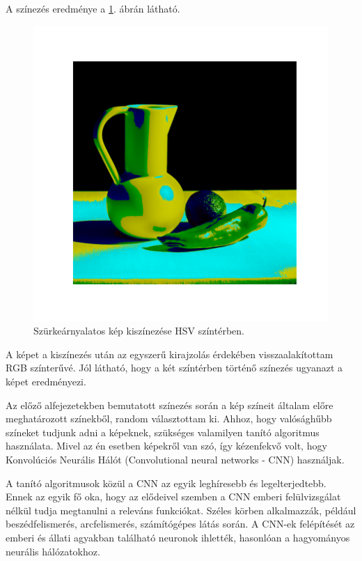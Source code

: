 A színezés eredménye a \ref{fig:colorized_hsv}. ábrán látható.

\begin{figure}[h]
\centering
\includegraphics[scale=0.7]{images/colorized_hsv.png}
\caption{Szürkeárnyalatos kép kiszínezése HSV színtérben.}
\label{fig:colorized_hsv}
\end{figure}

A képet a kiszínezés után az egyszerű kirajzolás érdekében visszaalakítottam RGB színterűvé. Jól látható, hogy a két színtérben történő színezés ugyanazt a képet eredményezi.


Az előző alfejezetekben bemutatott színezés során a kép színeit általam előre meghatározott színekből, random választottam ki. Ahhoz, hogy valósághűbb színeket tudjunk adni a képeknek, szükséges valamilyen tanító algoritmus használata.  Mivel az én esetben képekről van szó, így kézenfekvő volt, hogy Konvolúciós Neurális Hálót (Convolutional neural networks - CNN) használjak.

A tanító algoritmusok közül a CNN az egyik leghíresebb és legelterjedtebb. Ennek az egyik fő oka, hogy az elődeivel szemben a CNN emberi felülvizsgálat nélkül tudja megtanulni a releváns funkciókat. Széles körben alkalmazzák, például beszédfelismerés, arcfelismerés, számítógépes látás során. A CNN-ek felépítését az emberi és állati agyakban található neuronok ihlették, hasonlóan a hagyományos neurális hálózatokhoz.

